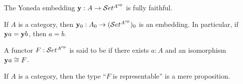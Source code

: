 \documentclass[hott-all.tex]{subfiles}
\begin{document}
\begin{cor}
  The Yoneda embedding $\mathbf{y} :A\to \mathcal{S}et^{A^{\mathrm{op}}}$ is fully faithful.
\end{cor}

\begin{cor}
  If $A$ is a category, then $\mathbf{y}_0 : A_0 \to (\mathcal{S}et^{A^{\mathrm{op}}})_0$ is an embedding.
  In particular, if $\mathbf{y} a = \mathbf{y} b$, then $a=b$.
\end{cor}

\begin{defn}
  A functor $F:\mathcal{S}et^{A^{\mathrm{op}}}$ is said to be 
  if there exists $a:A$ and an isomorphism $\mathbf{y} a \cong F$.
\end{defn}

\begin{thm}
  If $A$ is a category, then the type ``$F$ is representable'' is a mere proposition.
\end{thm}
%
\end{document}
